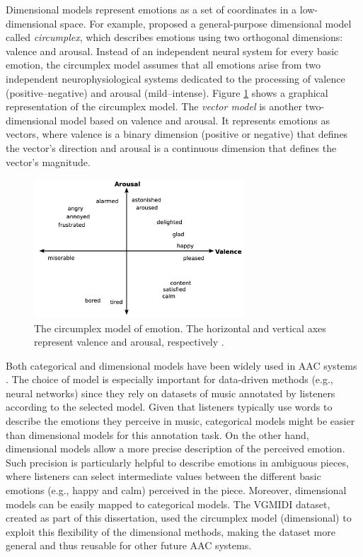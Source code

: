 Dimensional models represent emotions as a set of coordinates in a low-dimensional space. For example, \citet{russell1980circumplex} proposed a general-purpose dimensional model called \textit{circumplex}, which describes emotions using two orthogonal dimensions: valence and arousal. Instead of an independent neural system for every basic emotion, the circumplex model assumes that all emotions arise from two independent neurophysiological systems dedicated to the processing of valence (positive--negative) and arousal (mild--intense). Figure \ref{fig:circumplex} shows a graphical representation of the circumplex model. The \textit{vector model} \cite{bradley1992remembering} is another two-dimensional model based on valence and arousal. It represents emotions as vectors, where valence is a binary dimension (positive or negative) that defines the vector's direction and arousal is a continuous dimension that defines the vector's magnitude.

\begin{figure}[!h]
\centering
\includegraphics[width=0.7\textwidth]{imgs/related_work/circumplex.png}
\caption{The circumplex model of emotion. The horizontal and vertical axes represent valence and arousal,
respectively \cite{russell1980circumplex}.}
\label{fig:circumplex}
\end{figure}

Both categorical and dimensional models have been widely used in AAC systems \cite{williams2015investigating}. The choice of model is especially important for data-driven methods (e.g., neural networks) since they rely on datasets of music annotated by listeners according to the selected model. Given that listeners typically use words to describe the emotions they perceive in music, categorical models might be easier than dimensional models for this annotation task. On the other hand, dimensional models allow a more precise description of the perceived emotion. Such precision is particularly helpful to describe emotions in ambiguous pieces, where listeners can select intermediate values between the different basic emotions (e.g., happy and calm) perceived in the piece. Moreover, dimensional models can be easily mapped to categorical models. The VGMIDI dataset, created as part of this dissertation, used the circumplex model (dimensional) to exploit this flexibility of the dimensional methods, making the dataset more general and thus reusable for other future AAC systems.

